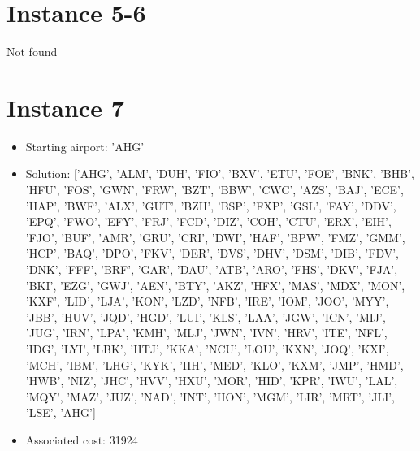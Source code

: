 \section*{Instance 5-6}

Not found

\section*{Instance 7}
\begin{itemize}
    \item Starting airport: 'AHG'
    \item Solution: ['AHG', 'ALM', 'DUH', 'FIO', 'BXV', 'ETU', 'FOE', 'BNK', 'BHB', 'HFU', 'FOS', 'GWN', 'FRW', 'BZT', 'BBW', 'CWC', 'AZS', 'BAJ', 'ECE', 'HAP', 'BWF', 'ALX', 'GUT', 'BZH', 'BSP', 'FXP', 'GSL', 'FAY', 'DDV', 'EPQ', 'FWO', 'EFY', 'FRJ', 'FCD', 'DIZ', 'COH', 'CTU', 'ERX', 'EIH', 'FJO', 'BUF', 'AMR', 'GRU', 'CRI', 'DWI', 'HAF', 'BPW', 'FMZ', 'GMM', 'HCP', 'BAQ', 'DPO', 'FKV', 'DER', 'DVS', 'DHV', 'DSM', 'DIB', 'FDV', 'DNK', 'FFF', 'BRF', 'GAR', 'DAU', 'ATB', 'ARO', 'FHS', 'DKV', 'FJA', 'BKI', 'EZG', 'GWJ', 'AEN', 'BTY', 'AKZ', 'HFX', 'MAS', 'MDX', 'MON', 'KXF', 'LID', 'LJA', 'KON', 'LZD', 'NFB', 'IRE', 'IOM', 'JOO', 'MYY', 'JBB', 'HUV', 'JQD', 'HGD', 'LUI', 'KLS', 'LAA', 'JGW', 'ICN', 'MIJ', 'JUG', 'IRN', 'LPA', 'KMH', 'MLJ', 'JWN', 'IVN', 'HRV', 'ITE', 'NFL', 'IDG', 'LYI', 'LBK', 'HTJ', 'KKA', 'NCU', 'LOU', 'KXN', 'JOQ', 'KXI', 'MCH', 'IBM', 'LHG', 'KYK', 'IIH', 'MED', 'KLO', 'KXM', 'JMP', 'HMD', 'HWB', 'NIZ', 'JHC', 'HVV', 'HXU', 'MOR', 'HID', 'KPR', 'IWU', 'LAL', 'MQY', 'MAZ', 'JUZ', 'NAD', 'INT', 'HON', 'MGM', 'LIR', 'MRT', 'JLI', 'LSE', 'AHG']
    \item Associated cost: 31924
\end{itemize}

